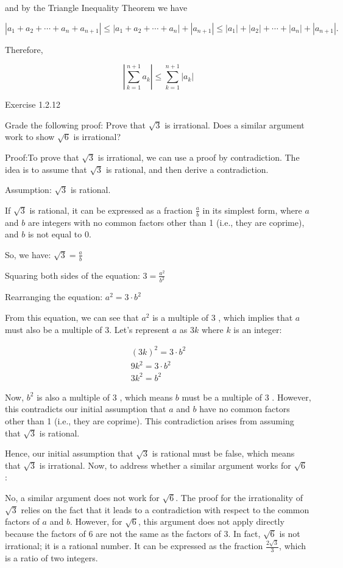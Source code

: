 \documentclass{report}
\begin{document}
and by the Triangle Inequality Theorem we have

$$
\left|a_1 + a_2 + \cdots + a_n + a_{n+1}\right|  \leq
\left|a_1 + a_2 + \cdots + a_n\right| + \left|a_{n+1}\right|  \leq \left|a_{1}\right| + \left|a_{2}\right|
+ \cdots +  \left|a_{n}\right|  + \left|a_{n+1}\right|.$$


Therefore,

$$
\left|\sum_{k=1}^{n+1} a_{k}\right| \leq \sum_{k=1}^{n+1}\left|a_{k}\right|$$



\qs{}
{Exercise 1.2.12}

\qs{}
{Grade the following proof: Prove that $\sqrt{3}$ is irrational. Does a similar argument work to show $\sqrt{6}$ is irrational?}

Proof:To prove that $\sqrt{3}$ is irrational, we can use a proof by contradiction. The idea is to assume that $\sqrt{3}$ is rational, and then derive a contradiction.

Assumption: $\sqrt{3}$ is rational.

If $\sqrt{3}$ is rational, it can be expressed as a fraction $\frac{a}{b}$ in its simplest form, where $a$ and $b$ are integers with no common factors other than 1 (i.e., they are coprime), and $b$ is not equal to 0.

So, we have: $\sqrt{3}=\frac{a}{b}$

Squaring both sides of the equation: $3=\frac{a^{2}}{b^{2}}$

Rearranging the equation: $a^{2}=3 \cdot b^{2}$

From this equation, we can see that $a^{2}$ is a multiple of 3 , which implies that $a$ must also be a multiple of 3. Let's represent $a$ as $3 k$ where $k$ is an integer:

$$
\begin{gathered}
(3 k)^{2}=3 \cdot b^{2} \\
9 k^{2}=3 \cdot b^{2} \\
3 k^{2}=b^{2}
\end{gathered}
$$

Now, $b^{2}$ is also a multiple of 3 , which means $b$ must be a multiple of 3 . However, this contradicts our initial assumption that $a$ and $b$ have no common factors other than 1 (i.e., they are coprime). This contradiction arises from assuming that $\sqrt{3}$ is rational.

Hence, our initial assumption that $\sqrt{3}$ is rational must be false, which means that $\sqrt{3}$ is irrational. Now, to address whether a similar argument works for $\sqrt{6}$ :

No, a similar argument does not work for $\sqrt{6}$. The proof for the irrationality of $\sqrt{3}$ relies on the fact that it leads to a contradiction with respect to the common factors of $a$ and $b$. However, for $\sqrt{6}$, this argument does not apply directly because the factors of 6 are not the same as the factors of 3. In fact, $\sqrt{6}$ is not irrational; it is a rational number. It can be expressed as the fraction $\frac{2 \sqrt{3}}{3}$, which is a ratio of two integers.
\end{document}
